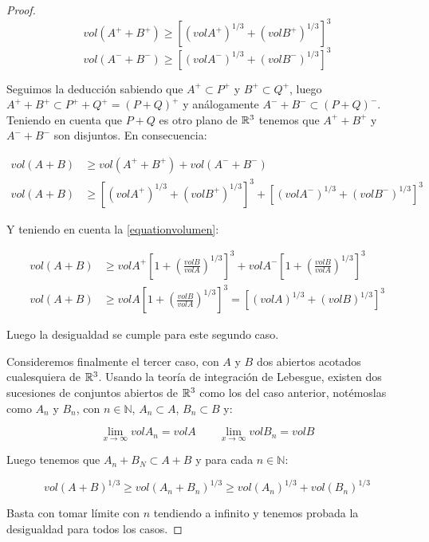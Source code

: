\begin{proof}
\begin{equation*}
    vol (A^+ + B^+) \geq \left[ (vol A^+)^{1/3} + (vol B^+)^{1/3} \right]^3
\end{equation*}
\begin{equation*}
    vol (A^- + B^-) \geq \left[ (vol A^-)^{1/3} + (vol B^-)^{1/3} \right]^3
\end{equation*}

Seguimos la deducción sabiendo que $A^+ \subset P^+$ y $B^+ \subset Q^+$, luego $A^+ + B^+ \subset P^+ + Q^+ = (P+Q)^+$ y análogamente $A^- + B^- \subset (P+Q)^-$. Teniendo en cuenta que $P+Q$ es otro plano de $\mathbb{R}^3$ tenemos que $A^+ + B^+$ y $A^- + B^-$ son disjuntos. En consecuencia:

\begin{align*}
    vol (A+B) &\geq vol(A^+ + B^+) + vol(A^- + B^-) \\
    vol (A+B) &\geq \left[ (vol A^+)^{1/3} + (vol B^+)^{1/3} \right]^3 + \left[ (vol A^-)^{1/3} + (vol B^-)^{1/3} \right]^3
\end{align*}

Y teniendo en cuenta la \autoref{equationvolumen}:

\begin{align*}
    vol (A+B) &\geq vol A^+ \left[ 1 + \left( \frac{vol B}{vol A} \right)^{1/3}  \right]^3 + vol A^- \left[ 1 + \left( \frac{vol B}{vol A} \right)^{1/3}  \right]^3 \\
    vol (A+B) &\geq vol A \left[ 1 + \left( \frac{vol B}{vol A} \right)^{1/3}  \right]^3 = \left[ (vol A)^{1/3} + (vol B)^{1/3} \right]^3
\end{align*}

Luego la desigualdad se cumple para este segundo caso.

Consideremos finalmente el tercer caso, con $A$ y $B$ dos abiertos acotados cualesquiera de $\mathbb{R}^3$. Usando la teoría de integración de Lebesgue, existen dos sucesiones de conjuntos abiertos de $\mathbb{R}^3$ como los del caso anterior, notémoslas como $A_n$ y $B_n$, con $n \in \mathbb{N}$, $A_n \subset A$, $B_n \subset B$ y:

\begin{equation*}
    \lim_{x \to \infty} vol A_n = vol A \qquad \lim_{x \to \infty} vol B_n = vol B
\end{equation*}

Luego tenemos que $A_n + B_N \subset A + B$ y para cada $n \in \mathbb{N}$:

\begin{equation*}
    vol (A+B)^{1/3} \geq vol (A_n+B_n)^{1/3} \geq vol (A_n) ^{1/3} + vol(B_n)^{1/3}
\end{equation*}

Basta con tomar límite con $n$ tendiendo a infinito y tenemos probada la desigualdad para todos los casos.
\end{proof}

